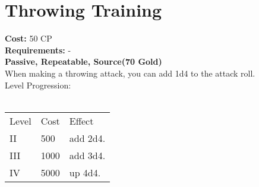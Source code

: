 \section{Throwing Training}
\textbf{Cost:} 50 CP\\
\textbf{Requirements:} -\\
\textbf{Passive, Repeatable, Source(70 Gold)}\\
When making a throwing attack, you can add 1d4 to the attack roll.
\\
Level Progression:\\
\\
\begin{tabular}{l | l | l}
	Level & Cost & Effect\\
	II & 500 & add 2d4.\\
	III & 1000 & add 3d4.\\
	IV & 5000 & up 4d4.\\
\end{tabular}